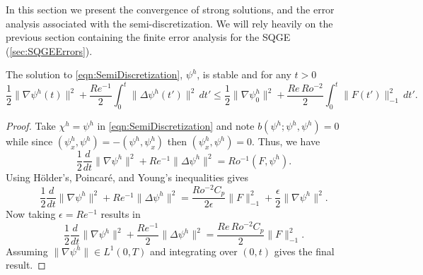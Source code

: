 In this section we present the convergence of strong solutions, and the error
analysis associated with the semi-discretization. We will rely heavily on the
previous section containing the finite error analysis for the SQGE
(\autoref{sec:SQGEErrors}).

\begin{prop} \label{prop:Stability}
  The solution to \eqref{eqn:SemiDiscretization}, $\psi^h$, is stable and for any $t>0$
  \begin{equation}
    \frac{1}{2}\|\nabla \psi^h(t)\|^2 + \frac{Re^{-1}}{2}\int_{0}^{t}\! \|\Delta
      \psi^h(t')\|^2 \, dt' \le \frac{1}{2} \|\nabla \psi^h_0\|^2
      + \frac{Re\, Ro^{-2}}{2} \int_{0}^{t}\! \|F(t')\|^2_{-1}\, dt'.
    \label{eqn:Stability}
  \end{equation}
\end{prop}
\begin{proof}
  Take $\chi^h = \psi^h$ in \eqref{eqn:SemiDiscretization} and note $b(\psi^h;\psi^h,\psi^h)
  = 0$ while since $(\psi^h_x,\psi^h) = -(\psi^h,\psi^h_x)$ then $(\psi^h_x,
  \psi^h) = 0$. Thus, we have
  \begin{equation*}
    \frac{1}{2} \frac{d}{dt} \|\nabla \psi^h\|^2 + Re^{-1} \|\Delta \psi^h\|^2 =
      Ro^{-1} (F,\psi^h).
  \end{equation*}
  Using H\"older's, Poincar\'e, and Young's inequalities gives
  \begin{equation*}
    \frac{1}{2} \frac{d}{dt} \|\nabla \psi^h\|^2 + Re^{-1} \|\Delta \psi^h\|^2 =
      \frac{Ro^{-2} C_p}{2\epsilon} \|F\|_{-1}^2 + \frac{\epsilon}{2}\|\nabla
      \psi^h\|^2.
  \end{equation*}
  Now taking $\epsilon = Re^{-1}$ results in
  \begin{equation*}
    \frac{1}{2} \frac{d}{dt} \|\nabla \psi^h\|^2 + \frac{Re^{-1}}{2} \|\Delta
      \psi^h\|^2 = \frac{Re\,Ro^{-2} C_p}{2} \|F\|_{-1}^2.
  \end{equation*}
  Assuming $\|\nabla \psi^h\| \in L^1(0,T)$ and integrating over $(0,t)$ gives
  the final result.
\end{proof}

